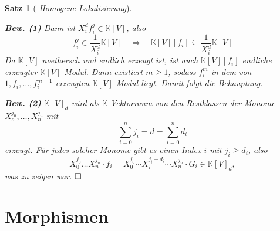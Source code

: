 \documentclass[11pt]{book}
\newtheorem{theorem}{Satz}[section]
\theoremstyle{nonumberbreak}
\newenvironment{pr}[1][]{\ifthenelse{\equal{#1}{}}{\proof}{\proof[#1]}\rm}{\endproof}
\begin{document}
\begin{spacing}{1.3}
\begin{theorem}[ \rm \it Homogene Lokalisierung]
\begin{pr}
\begin{compactenum}
\begin{compactenum}
\item[\textbf{Bew. (1)}] Dann ist $X_i^d f_i^j \in \mathbb{K}[V]$, also
$$f_i^j \in \frac{1}{X_i^d} \mathbb{K}[V] \quad \Longrightarrow \quad  \mathbb{K}[V] [f_i ] \subseteq \frac{1}{X_i^d} \mathbb{K}[V]$$
Da $\mathbb{K}[V]$ noethersch und endlich erzeugt ist, ist auch $\mathbb{K}[V][f_i]$ endliche erzeugter $\mathbb{K}[V]$-Modul. Dann existiert $m \geqslant 1 $, sodass $f_i^m$ in dem von $1,f_i, \ldots, f_i^{m-1}$ erzeugten $\mathbb{K}[V]$-Modul liegt. Damit folgt die Behauptung.
\item[\textbf{Bew. (2)}] $\mathbb{K}[V]_d$ wird als $\mathbb{K}$-Vektorraum von den Restklassen der Monome $X_o^{j_0}, \ldots, X_n^{j_n}$ mit
$$\sum_{i=0}^n j_i = d = \sum_{i=0}^n d_i$$
erzeugt. Für jedes solcher Monome gibt es einen Index $i$ mit $j_i \geqslant d_i$, also
$$X_0^{j_0} \dots X_n^{j_n} \cdot f_i = X_0^{j_0} \cdots X_i^{j_i-d_i} \cdots X_n^{j_n} \cdot G_i \in \mathbb{K}[V]_d,$$
was zu zeigen war. $\hfill \Box$
\end{compactenum}

\end{compactenum}
\end{pr}
\end{theorem}





\renewcommand*\thesection{§ \arabic{section}\quad}
\section{Morphismen} %
\renewcommand*\thesection{\arabic{section}}


\end{spacing}
\end{document}
